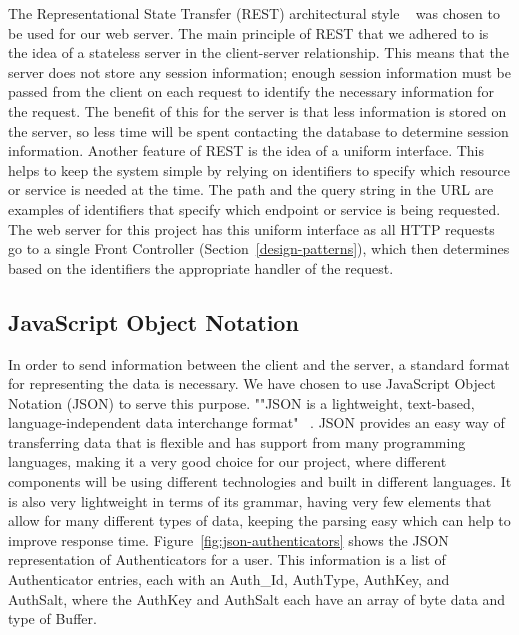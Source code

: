 \documentclass[12pt]{report}
\let\Oldsubsection\subsection
\renewcommand{\subsection}{\FloatBarrier\Oldsubsection}
\begin{document}
The Representational State Transfer (REST) architectural style ~\autocite{RESTARCHSTYLE} was chosen to be used
for our web server. The main principle of REST that we adhered to is the idea of a stateless
server in the client-server relationship. This means that the server does not store any session
information; enough session information must be passed from the client on each request to
identify the necessary information for the request. The benefit of this for the server is that less
information is stored on the server, so less time will be spent contacting the database to
determine session information. Another feature of REST is the idea of a uniform interface. This
helps to keep the system simple by relying on identifiers to specify which resource or service is
needed at the time. The path and the query string in the URL are examples of identifiers that
specify which endpoint or service is being requested. The web server for this project has this
uniform interface as all HTTP requests go to a single Front Controller (Section~\ref{design-patterns}), which
then determines based on the identifiers the appropriate handler of the request.

\subsection{JavaScript Object Notation} \label{javascript-object-notation}

In order to send information between the client and the server, a standard format for
representing the data is necessary. We have chosen to use JavaScript Object Notation (JSON) to
serve this purpose. ""JSON is a lightweight, text-based, language-independent data interchange
format" ~\autocite{JSONREF}. JSON provides an easy way of transferring data that is flexible and has support
from many programming languages, making it a very good choice for our project, where
different components will be using different technologies and built in different languages. It is
also very lightweight in terms of its grammar, having very few elements that allow for many
different types of data, keeping the parsing easy which can help to improve response time.
Figure~\ref{fig:json-authenticators} shows the JSON representation of Authenticators for a
user. This information is a list of Authenticator entries, each with an Auth\_Id, AuthType,
AuthKey, and AuthSalt, where the AuthKey and AuthSalt each have an array of byte data and type
of Buffer.
\end{document}
